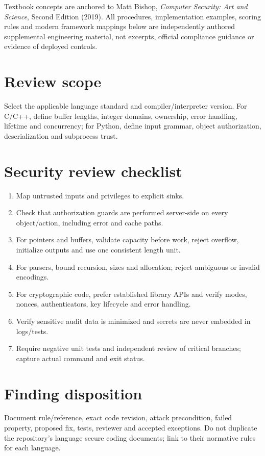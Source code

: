\documentclass[10pt,letterpaper]{article}
\begin{document}
\makedoctocpage
\begin{notebox}
Textbook concepts are anchored to Matt Bishop, \emph{Computer Security: Art and Science}, Second Edition (2019). All procedures, implementation examples, scoring rules and modern framework mappings below are independently authored supplemental engineering material, not excerpts, official compliance guidance or evidence of deployed controls.
\end{notebox}
\section{Review scope}
Select the applicable language standard and compiler/interpreter version. For C/C++, define buffer lengths, integer domains, ownership, error handling, lifetime and concurrency; for Python, define input grammar, object authorization, deserialization and subprocess trust.
\section{Security review checklist}
\begin{enumerate}
\item Map untrusted inputs and privileges to explicit sinks.
\item Check that authorization guards are performed server-side on every object/action, including error and cache paths.
\item For pointers and buffers, validate capacity before work, reject overflow, initialize outputs and use one consistent length unit.
\item For parsers, bound recursion, sizes and allocation; reject ambiguous or invalid encodings.
\item For cryptographic code, prefer established library APIs and verify modes, nonces, authenticators, key lifecycle and error handling.
\item Verify sensitive audit data is minimized and secrets are never embedded in logs/tests.
\item Require negative unit tests and independent review of critical branches; capture actual command and exit status.
\end{enumerate}
\section{Finding disposition}
Document rule/reference, exact code revision, attack precondition, failed property, proposed fix, tests, reviewer and accepted exceptions. Do not duplicate the repository's language secure coding documents; link to their normative rules for each language.
\end{document}
